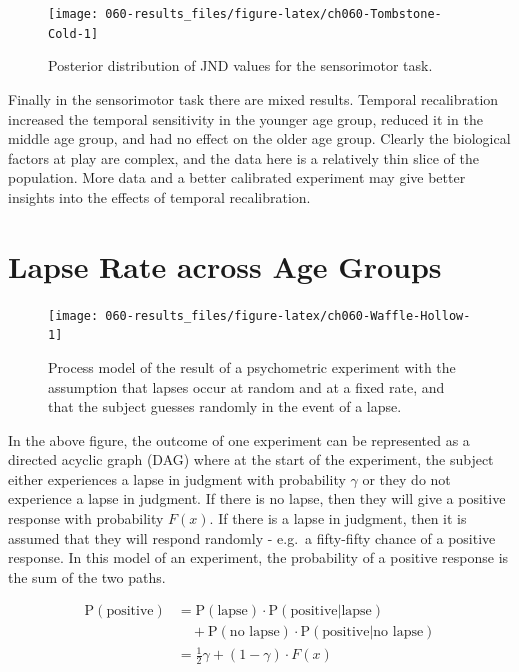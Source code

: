 \documentclass[11pt, oneside, openany]{scrbook}
\begin{document}
\begin{figure}

{\centering \texttt{[image: 060-results\_files/figure-latex/ch060-Tombstone-Cold-1]} 

}

\caption{Posterior distribution of JND values for the sensorimotor task.}\label{fig:ch060-Tombstone-Cold}
\end{figure}

Finally in the sensorimotor task there are mixed results. Temporal recalibration increased the temporal sensitivity in the younger age group, reduced it in the middle age group, and had no effect on the older age group. Clearly the biological factors at play are complex, and the data here is a relatively thin slice of the population. More data and a better calibrated experiment may give better insights into the effects of temporal recalibration.

\hypertarget{lapse-rate-across-age-groups}{%
\section{Lapse Rate across Age Groups}\label{lapse-rate-across-age-groups}}

\begin{figure}

{\centering \texttt{[image: 060-results\_files/figure-latex/ch060-Waffle-Hollow-1]} 

}

\caption{Process model of the result of a psychometric experiment with the assumption that lapses occur at random and at a fixed rate, and that the subject guesses randomly in the event of a lapse.}\label{fig:ch060-Waffle-Hollow}
\end{figure}

In the above figure, the outcome of one experiment can be represented as a directed acyclic graph (DAG) where at the start of the experiment, the subject either experiences a lapse in judgment with probability \(\gamma\) or they do not experience a lapse in judgment. If there is no lapse, then they will give a positive response with probability \(F(x)\). If there is a lapse in judgment, then it is assumed that they will respond randomly - e.g.~a fifty-fifty chance of a positive response. In this model of an experiment, the probability of a positive response is the sum of the two paths.

\begin{align}
\mathrm{P}(\textrm{positive}) &= 
  \mathrm{P}(\textrm{lapse}) \cdot \mathrm{P}(\textrm{positive} | \textrm{lapse}) \\
  &\quad + \mathrm{P}(\textrm{no lapse}) \cdot \mathrm{P}(\textrm{positive} | \textrm{no lapse}) \\
  &= \frac{1}{2} \gamma + (1 - \gamma) \cdot F(x)
\end{align}
\end{document}

